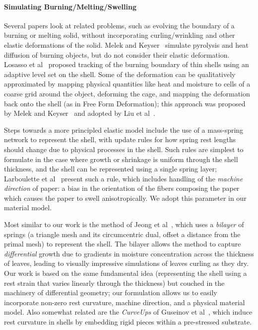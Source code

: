 \documentclass[timestamp,acmtog]{acmart}
\begin{document}
\paragraph{Simulating Burning/Melting/Swelling} Several papers look at related problems, such as evolving the boundary of a burning or melting solid, without incorporating curling/wrinkling and other elastic deformations of the solid. Melek and Keyser~ simulate pyrolysis and heat diffusion of burning objects, but do not consider their elastic deformation. Losasso et al~ proposed tracking of the burning boundary of thin shells using an adaptive level set on the shell. Some of the deformation can be qualitatively approximated by mapping physical quantities like heat and moisture to cells of a coarse grid around the object, deforming the cage, and mapping the deformation back onto the shell (as in Free Form Deformation); this approach was proposed by Melek and Keyser~ and adopted by Liu et al~.

Steps towards a more principled elastic model include the use of a mass-spring network to represent the shell, with update rules for how spring rest lengths should change due to physical processes in the shell. Such rules are simplest to formulate in the case where growth or shrinkage is uniform through the shell thickness, and the shell can be represented using a single spring layer; Larboulette et al~ present such a rule, which includes handling of the \emph{machine direction} of paper: a bias in the orientation of the fibers composing the paper which causes the paper to swell anisotropically. We adopt this parameter in our material model. 

Most similar to our work is the method of Jeong et al~, which uses a \emph{bilayer} of springs (a triangle mesh and its circumcentric dual, offset a distance from the primal mesh) to represent the shell. The bilayer allows the method to capture \emph{differential} growth due to gradients in moisture concentration across the thickness of leaves, leading to visually impressive simulations of leaves curling as they dry. Our work is based on the same fundamental idea (representing the shell using a rest strain that varies linearly through the thickness) but couched in the machinery of differential geometry; our formulation allows us to easily incorporate non-zero rest curvature, machine direction, and a physical material model. Also somewhat related are the \emph{CurveUps} of Guseinov et al~, which induce rest curvature in shells by embedding rigid pieces within a pre-stressed substrate.
\end{document}
